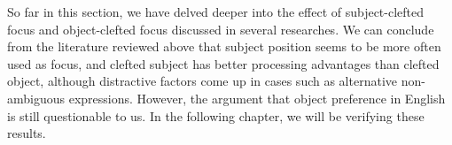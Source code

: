 So far in this section, we have delved deeper into the effect of subject-clefted focus and object-clefted focus discussed in several researches. We can conclude from the literature reviewed above that subject position seems to be more often used as focus, and clefted subject has better processing advantages than clefted object, although distractive factors come up in cases such as alternative non-ambiguous expressions. However, the argument that object preference in English \citep{reichle2014} is still questionable to us. In the following chapter, we will be verifying these results.